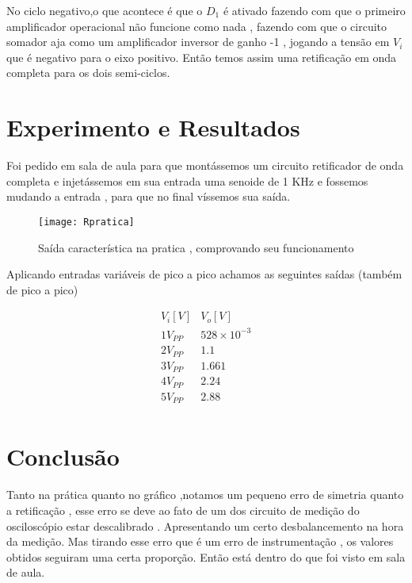 \documentclass[11pt]{article}
\begin{document}
  No ciclo negativo,o que acontece é que o  $D_1$ é ativado fazendo com que o primeiro amplificador operacional não funcione como nada , fazendo com que o circuito somador aja como um amplificador inversor de ganho -1 , jogando a tensão em $V_i$ que é negativo para o eixo positivo. Então temos assim uma retificação em onda completa para os dois semi-ciclos.
  \section{Experimento e Resultados}
  Foi pedido em sala de aula para que montássemos um circuito retificador de onda completa e injetássemos em sua entrada uma senoide de 1 KHz e fossemos mudando a entrada , para que no final víssemos sua saída.
  \begin{center}
  \begin{figure}[!h]
  \texttt{[image: Rpratica]}
  \caption{Saída característica na pratica , comprovando seu funcionamento}
  \end{figure}
  \end{center}
  Aplicando entradas variáveis de pico a pico achamos as seguintes saídas (também de pico a pico)
  
  $$
\begin{array}{c|c}
V_i[V] & V_o[V]\\
\hline
1 V_{PP} & 528 \times 10^{-3}  \\
2 V_{PP} & 1.1  \\
3 V_{PP} &  1.661 \\
4 V_{PP} &  2.24 \\
5 V_{PP} &  2.88 \\
\end{array}    
  $$
  \section{Conclusão}
  Tanto na prática quanto no gráfico ,notamos um pequeno erro de simetria quanto a retificação , esse erro se deve ao fato de um dos circuito de medição do osciloscópio estar descalibrado . Apresentando um certo desbalancemento na hora da medição. Mas tirando esse erro que é um erro de instrumentação , os valores obtidos seguiram uma certa proporção. Então está dentro do que foi visto em sala de aula.
\end{document}
